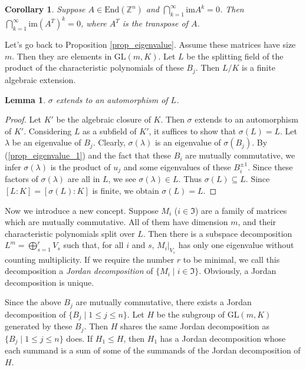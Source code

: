 \documentclass[12pt]{amsart}
\theoremstyle{plain}
\newtheorem{corollary}[theorem]{Corollary}
\newtheorem{lemma}[theorem]{Lemma}
\theoremstyle{definition}
\theoremstyle{question}
\theoremstyle{remark}
\theoremstyle{assumption}
\numberwithin{equation}{section}
\theoremstyle{bigthm}
\begin{document}
\begin{corollary}\label{cor_transpose}
Suppose $A \in \mathrm{End} (\mathbb{Z}^{n})$ and $\bigcap_{k=1}^{\infty} \mathrm{im} A^{k} =0$. Then $\bigcap_{k=1}^{\infty} \mathrm{im} (A^{T})^{k} =0$, where $A^{T}$ is the transpose of $A$.
\end{corollary}

Let's go back to Proposition \ref{prop_eigenvalue}. Assume these matrices have size $m$. Then they are elements in $\mathrm{GL} (m,K)$. Let $L$ be the splitting field of the product of the characteristic polynomials of these $B_{j}$. Then $L/K$ is a finite algebraic extension.

\begin{lemma}
$\sigma$ extends to an automorphism of $L$.
\end{lemma}
\begin{proof}
Let $K'$ be the algebraic closure of $K$. Then $\sigma$ extends to an automorphism of $K'$. Considering $L$ as a subfield of $K'$, it suffices to show that $\sigma (L) = L$. Let $\lambda$ be an eigenvalue of $B_{j}$. Clearly, $\sigma (\lambda)$ is an eigenvalue of $\sigma (B_{j})$. By (\ref{prop_eigenvalue_1}) and the fact that these $B_{i}$ are mutually commutative, we infer $\sigma (\lambda)$ is the product of $u_{j}$ and some eigenvalues of these $B_{i}^{\pm 1}$. Since these factors of $\sigma (\lambda)$ are all in $L$, we see $\sigma (\lambda) \in L$. Thus $\sigma (L) \subseteq L$. Since $[L:K] = [\sigma (L): K]$ is finite, we obtain $\sigma (L) = L$.
\end{proof}

Now we introduce a new concept. Suppose $M_{i}$ ($i \in \mathfrak{I}$) are a family of matrices which are mutually commutative. All of them have dimension $m$, and their characteristic polynomials split over $L$. Then there is a subspace decomposition $L^{m} = \bigoplus_{s=1}^{r} V_{s}$ such that, for all $i$ and $s$, $M_{i}|_{V_{s}}$ has only one eigenvalue without counting multiplicity. If we require the number $r$ to be minimal, we call this decomposition a \textit{Jordan decomposition} of $\{ M_{i} \mid i \in \mathfrak{I} \}$. Obviously, a Jordan decomposition is unique.

Since the above $B_{j}$ are mutually commutative, there exists a Jordan decomposition of $\{ B_{j} \mid 1 \leq j \leq n \}$. Let $H$ be the subgroup of $\mathrm{GL} (m,K)$ generated by these $B_{j}$. Then $H$ shares the same Jordan decomposition as $\{ B_{j} \mid 1 \leq j \leq n \}$ does. If $H_{1} \le H$, then $H_{1}$ has a Jordan decomposition whose each summand is a sum of some of the summands of the Jordan decomposition of $H$.
\end{document}
